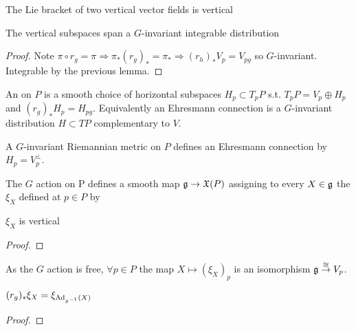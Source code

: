 \documentclass{article}
\begin{document}
\begin{lemma}
The Lie bracket of two vertical vector fields is vertical
\end{lemma}

\begin{lemma}
The vertical subspaces span a $G$-invariant integrable distribution
\end{lemma}
\begin{proof}
Note $\pi \circ r_g = \pi \Rightarrow \pi_\ast (r_g)_\ast = \pi_\ast \Rightarrow (r_h)_\ast V_p = V_{pg}$ so $G$-invariant. Integrable by the previous lemma.
\end{proof}

\begin{definition}
An  on $P$ is a smooth choice of horizontal subspaces $H_p \subset T_p P$ s.t. $T_p P = V_p \oplus H_p$ and $(r_g)_\ast H_p = H_{pg}$. Equivalently an Ehresmann connection is a $G$-invariant distribution $H \subset TP$ complementary to $V$. 
\end{definition}

\begin{example}
A $G$-invariant Riemannian metric on $P$ defines an Ehresmann connection by $H_p = V_p^\perp$. 
\end{example}

The $G$ action on P defines a smooth map $\mathfrak{g} \to \mathfrak{X}(P)$ assigning to every $X\in \mathfrak{g}$ the   $\xi_X$ defined at $p \in P$ by  

\begin{lemma}
$\xi_X$ is vertical
\end{lemma}
\begin{proof}
\end{proof}
As the $G$ action is free, $\forall p \in P$ the map $X \mapsto (\xi_X)_p$ is an isomorphism $\mathfrak{g} \overset{\cong}{\to} V_p$. 

\begin{lemma}
$(r_g)_\ast \xi_X = \xi_{\operatorname{Ad}_{g^{-1}}(X)}$
\end{lemma}
\begin{proof}
\end{proof}
\end{document}
